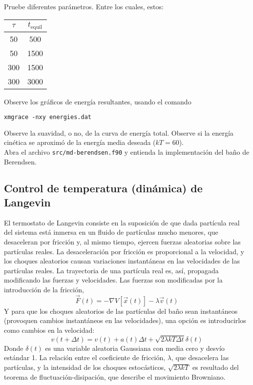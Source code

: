 \documentclass[10pt,a4paper,ssfamily]{exam}
\newcommand{\1}{{\bf 1}}
\newcommand{\2}{{\bf 2}}
\newcommand{\3}{{\bf 3}}
\newcommand{\command}[1]{\begin{center}{\tt #1}\end{center}}
\begin{document}
Pruebe diferentes parámetros. Entre los cuales, estos: 
{\tt \begin{center}\begin{tabular}{cc}
\hline
  $\tau$ & $t_{\mathrm{equil}}$ \\
\hline
    50   &  500 \\
    50   &  1500 \\
   300   &  1500 \\
   300   &  3000 \\
\hline
\end{tabular}\end{center}}
Observe los gráficos de energía resultantes, usando el comando
\command{xmgrace -nxy energies.dat}
Observe la suavidad, o no, de la curva de energía total. Observe si la
energía cinética se aproximó de la energía media deseada ($kT=60$).\\

\noindent
Abra el archivo {\tt src/md-berendsen.f90} y entienda la implementación
del baño de Berendsen.

\subsection{Control de temperatura (dinámica) de Langevin}

El termostato de Langevin consiste en la suposición de que dada
partícula real del sistema está inmersa en un fluido de partículas mucho
menores, que desaceleran por fricción y, al mismo tiempo,
ejercen fuerzas aleatorias sobre las partículas reales. La
desaceleración por fricción es proporcional a la velocidad, y los
choques aleatorios causan variaciones instantáneas en las velocidades de
las partículas reales. La trayectoria de una partícula real es, así,
propagada modificando las fuerzas y velocidades. Las fuerzas son
modificadas por la introducción de la fricción,
\[
\vec{F}(t) = -\nabla V[\vec{x}(t)] - \lambda \vec{v}(t)
\]
Y para que los choques aleatorios de las partículas del baño sean
instantáneos (provoquen cambios instantáneos en las velocidades), una
opción es introducirlos como cambios en la velocidad:
\[
v(t+\Delta t) = v(t) + a(t)\Delta t 
+ \sqrt{2\lambda kT \Delta t}\delta(t)
\] 
Donde $\delta(t)$ es una variable aleatoria Gaussiana con media cero y
desvío estándar 1. La relación entre el coeficiente de fricción, $\lambda$,
que desacelera las partículas, y la intensidad de los choques
estocásticos, $\sqrt{2\lambda kT}$ es resultado del teorema de
fluctuación-disipación, que describe el movimiento Browniano.
\end{document}
